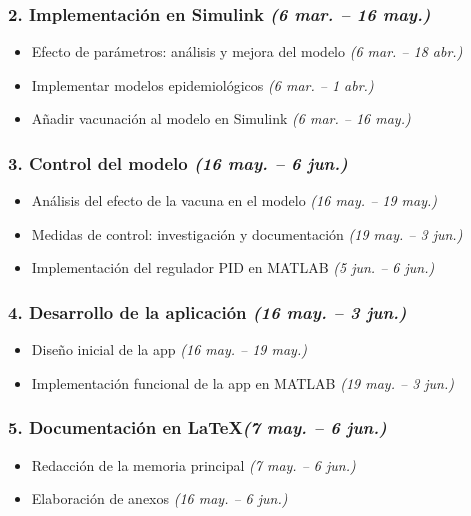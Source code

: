 \subsubsection*{2. Implementación en Simulink \hfill \textnormal{\textit{(6 mar. – 16 may.)}}}
\begin{itemize}
    \item Efecto de parámetros: análisis y mejora del modelo \hfill \textit{(6 mar. – 18 abr.)}
    \item Implementar modelos epidemiológicos \hfill \textit{(6 mar. – 1 abr.)}
    \item Añadir vacunación al modelo en Simulink \hfill \textit{(6 mar. – 16 may.)}
\end{itemize}

\subsubsection*{3. Control del modelo \hfill \textnormal{\textit{(16 may. – 6 jun.)}}}
\begin{itemize}
    \item Análisis del efecto de la vacuna en el modelo \hfill \textit{(16 may. – 19 may.)}
    \item Medidas de control: investigación y documentación \hfill \textit{(19 may. – 3 jun.)}
    \item Implementación del regulador PID en MATLAB \hfill \textit{(5 jun. – 6 jun.)}
\end{itemize}

\subsubsection*{4. Desarrollo de la aplicación \hfill \textnormal{\textit{(16 may. – 3 jun.)}}}
\begin{itemize}
    \item Diseño inicial de la app \hfill \textit{(16 may. – 19 may.)}
    \item Implementación funcional de la app en MATLAB \hfill \textit{(19 may. – 3 jun.)}
\end{itemize}

\subsubsection*{5. Documentación en \LaTeX \hfill \textnormal{\textit{(7 may. – 6 jun.)}}}
\begin{itemize}
    \item Redacción de la memoria principal \hfill \textit{(7 may. – 6 jun.)}
    \item Elaboración de anexos \hfill \textit{(16 may. – 6 jun.)}
\end{itemize}



